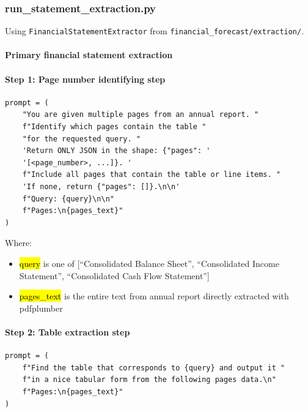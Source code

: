 \documentclass[12pt,a4paper]{article}
\begin{document}
\subsubsection{run\_statement\_extraction.py}

Using \texttt{FinancialStatementExtractor} from \texttt{financial\_forecast/extraction/}.

\paragraph{Primary financial statement extraction}

\paragraph{Step 1: Page number identifying step}

\begin{lstlisting}[style=python, caption={Step~1 prompt: identifying pages containing the target financial statement}, label=lst:prompt_step1]
prompt = (
    "You are given multiple pages from an annual report. "
    f"Identify which pages contain the table "
    "for the requested query. "
    'Return ONLY JSON in the shape: {"pages": '
    '[<page_number>, ...]}. '
    f"Include all pages that contain the table or line items. "
    'If none, return {"pages": []}.\n\n'
    f"Query: {query}\n\n"
    f"Pages:\n{pages_text}"
)
\end{lstlisting}

Where:

\begin{itemize}
\item
  \hl{query} is one of {[}``Consolidated Balance Sheet'', ``Consolidated
  Income Statement'', ``Consolidated Cash Flow Statement''{]}
\item
  \hl{pages\_text} is the entire text from annual report directly
  extracted with pdfplumber
\end{itemize}

\paragraph{Step 2: Table extraction step}

\begin{lstlisting}[style=python, caption={Step~2 prompt: extracting the primary financial statement table}, label=lst:prompt_step2]
prompt = (
    f"Find the table that corresponds to {query} and output it "
    f"in a nice tabular form from the following pages data.\n"
    f"Pages:\n{pages_text}"
)
\end{lstlisting}
\end{document}
